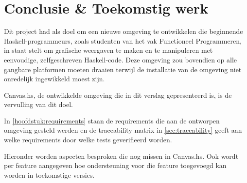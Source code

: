 \chapter{Conclusie \& Toekomstig werk} \label{hoofdstuk:conclusie}
Dit project had als doel om een nieuwe omgeving te ontwikkelen die beginnende Haskell-programmeurs, zoals studenten van het vak Functioneel Programmeren, in staat stelt om grafische weergaven te maken en te manipuleren met eenvoudige, zelfgeschreven Haskell-code. Deze omgeving zou bovendien op alle gangbare platformen moeten draaien terwijl de installatie van de omgeving niet onredelijk ingewikkeld moest zijn.

Canvas.hs, de ontwikkelde omgeving die in dit verslag gepresenteerd is, is de vervulling van dit doel. 

In \autoref{hoofdstuk:requirements} staan de requirements die aan de ontworpen omgeving gesteld werden en de traceability matrix in \autoref{sec:traceability} geeft aan welke requirements door welke tests geverifieerd worden.


Hieronder worden aspecten besproken die nog missen in Canvas.hs. Ook wordt per feature aangegeven hoe ondersteuning voor die feature toegevoegd kan worden in toekomstige versies.

